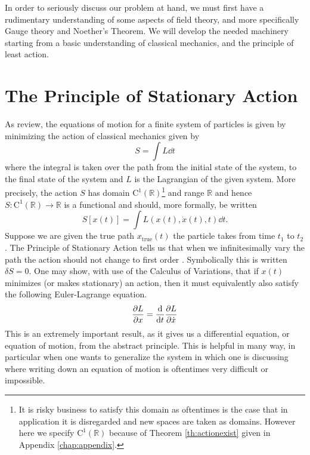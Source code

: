 
In order to seriously discuss our problem at hand, we must first have a rudimentary understanding of some aspects of field theory, and more specifically Gauge theory and Noether's Theorem. We will develop the needed machinery starting from a basic understanding of classical mechanics, and the principle of least action.

\section{The Principle of Stationary Action}\label{sec:stationary}
As review, the equations of motion for a finite system of particles is given by minimizing the action of classical mechanics given by
\begin{equation}\label{eq:action}
S = \int L\dd{t}
\end{equation}
where the integral is taken over the path from the initial state of the system, to the final state of the system and $L$ is the Lagrangian of the given system. More precisely, the action $S$ has domain $\mathrm{C}^1(\mathbb{R})$\footnote{It is risky business to satisfy this domain as oftentimes is the case that in application it is disregarded and new spaces are taken as domains. However here we specify $\mathrm{C}^1(\mathbb{R})$ because of Theorem \ref{th:actionexist} given in Appendix \ref{chap:appendix}.} and range $\mathbb{R}$ and hence $S:\mathrm{C}^1(\mathbb{R})\to \mathbb{R}$ is a functional and should, more formally, be written
\begin{equation}\label{eq:actionFunc}
S\left[x(t)\right] = \int L(x(t), \dot{x}(t), t)\dd{t}.
\end{equation}
Suppose we are given the true path $x_\mathrm{true}(t)$ the particle takes from time $t_1$ to $t_2$. The Principle of Stationary Action tells us that when we infinitesimally vary the path the action should not change to first order \cite{feynman}. Symbolically this is written $\delta S = 0$. One may show, with use of the Calculus of Variations, that if $x(t)$ minimizes (or makes stationary) an action, then it must equivalently also satisfy the following Euler-Lagrange equation.
\begin{equation}\label{eq:eulerlag}
\pdv{L}{x} = \dv{t} \pdv{L}{\dot{x}}
\end{equation}
This is an extremely important result, as it gives us a differential equation, or equation of motion, from the abstract principle. This is helpful in many way, in particular when one wants to generalize the system in which one is discussing where writing down an equation of motion is oftentimes very difficult or impossible.

